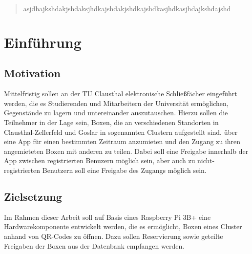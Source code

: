 \documentclass[openright,twoside,a4paper]{scrartcl}
\author{Janek Boll}
\date{\today}
\begin{document}

    

    \newpage

    \setcounter{page}{1}

    

    \newpage

    \vspace*{\fill}
    \begin{abstract}
        asjdhajkshdakjshdaksjhdkajshdakjshdkajshdkasjhdkasjhdajkshdajshd
    \end{abstract}
    \vspace*{\fill}

    \newpage

    \tableofcontents

    \newpage


    \section{Einführung}
        \subsection{Motivation}
            Mittelfristig sollen an der TU Clausthal elektronische Schließfächer eingeführt werden, die es Studierenden und Mitarbeitern der Universität ermöglichen, Gegenstände zu lagern und untereinander auszutauschen. Hierzu sollen die Teilnehmer in der Lage sein, Boxen, die an verschiedenen Standorten in Clausthal-Zellerfeld und Goslar in sogenannten Clustern aufgestellt sind, über eine App für einen bestimmten Zeitraum anzumieten und den Zugang zu ihren angemieteten Boxen mit anderen zu teilen. Dabei soll eine Freigabe innerhalb der App zwischen registrierten Benuzern möglich sein, aber auch zu nicht-registrierten Benutzern soll eine Freigabe des Zugangs möglich sein.
        
        \subsection{Zielsetzung}
            Im Rahmen dieser Arbeit soll auf Basis eines Raspberry Pi 3B+ eine Hardwarekomponente entwickelt werden, die es ermöglicht, Boxen eines Cluster anhand von QR-Codes zu öffnen. Dazu sollen Reservierung sowie geteilte Freigaben der Boxen aus der Datenbank empfangen werden. 
\end{document}
